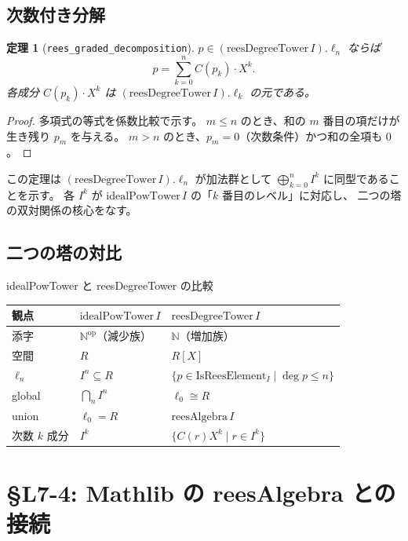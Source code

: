 \documentclass[a4paper,12pt]{article}
\theoremstyle{definition}
\theoremstyle{plain}
\newtheorem{theorem}[definition]{定理}
\newcommand{\Ipower}[1]{I^{#1}}
\newcommand{\reesdeg}{\mathrm{reesDegreeTower}}
\newcommand{\idealpow}{\mathrm{idealPowTower}}
\newcommand{\lev}[1]{\ell_{#1}}
\newcommand{\IsRees}{\mathrm{IsReesElement}}
\begin{document}
\subsection{次数付き分解}

\begin{theorem}[\texttt{rees\_graded\_decomposition}]
$p \in (\reesdeg\,I).\lev{n}$ ならば
\[
  p = \sum_{k=0}^{n} C(p_k) \cdot X^k.
\]
各成分 $C(p_k) \cdot X^k$ は $(\reesdeg\,I).\lev{k}$ の元である。
\end{theorem}
\begin{proof}
多項式の等式を係数比較で示す。
$m \leq n$ のとき、和の $m$ 番目の項だけが生き残り $p_m$ を与える。
$m > n$ のとき、$p_m = 0$（次数条件）かつ和の全項も $0$。
\end{proof}

この定理は $(\reesdeg\,I).\lev{n}$ が加法群として
$\bigoplus_{k=0}^{n} I^k$ に同型であることを示す。
各 $I^k$ が $\idealpow\,I$ の「$k$ 番目のレベル」に対応し、
二つの塔の双対関係の核心をなす。

\subsection{二つの塔の対比}

\begin{dualbox}{idealPowTower と reesDegreeTower の比較}
\begin{center}
\renewcommand{\arraystretch}{1.3}
\begin{tabular}{lll}
\toprule
観点 & $\idealpow\,I$ & $\reesdeg\,I$ \\
\midrule
添字 & $\mathbb{N}^{\mathrm{op}}$（減少族） & $\mathbb{N}$（増加族） \\
空間 & $R$ & $R[X]$ \\
$\lev{n}$ & $\Ipower{n} \subseteq R$ & $\{p \in \IsRees_I \mid \deg p \leq n\}$ \\
global & $\bigcap_n I^n$ & $\lev{0} \cong R$ \\
union & $\lev{0} = R$ & $\mathrm{reesAlgebra}\,I$ \\
次数 $k$ 成分 & $\Ipower{k}$ & $\{C(r) X^k \mid r \in \Ipower{k}\}$ \\
\bottomrule
\end{tabular}
\end{center}
\end{dualbox}

\section{\S{}L7-4: Mathlib の reesAlgebra との接続}
\end{document}
